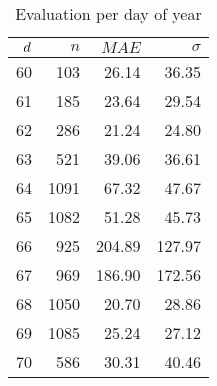 \begin{table}
  \centering
  \caption{Evaluation per day of year}
  \label{tab:eval_doy}
  \begin{tabular}{rrrr}
  \(d\) & \(n\) & \(MAE\) & \(\sigma\) \\
  \hline 
  60       &  103  &   26.14 &  36.35 \\
  61       &  185  &   23.64 &  29.54 \\
  62       &  286  &   21.24 &  24.80 \\
  63       &  521  &   39.06 &  36.61 \\
  64       & 1091  &   67.32 &  47.67 \\
  65       & 1082  &   51.28 &  45.73 \\
  66       &  925  &  204.89 & 127.97 \\
  67       &  969  &  186.90 & 172.56 \\
  68       & 1050  &   20.70 &  28.86 \\
  69       & 1085  &   25.24 &  27.12 \\
  70       &  586  &   30.31 &  40.46 \\
  \end{tabular}
\end{table}
